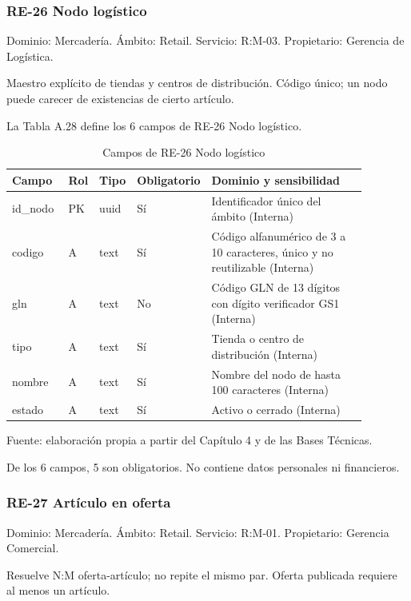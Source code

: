 \documentclass[11pt]{article}
\begin{document}
\subsubsection{RE-26 Nodo logístico}

Dominio: Mercadería. Ámbito: Retail. Servicio: R:M-03. Propietario: Gerencia de Logística.

Maestro explícito de tiendas y centros de distribución. Código único; un nodo puede carecer de existencias de cierto artículo.

La Tabla A.28 define los 6 campos de RE-26 Nodo logístico.

\begin{table}[htbp]
\caption{Campos de RE-26 Nodo logístico}\label{tab:d_re26}
\centering
\begin{tabular}{@{}p{0.167\linewidth}p{0.070\linewidth}p{0.079\linewidth}p{0.097\linewidth}p{0.465\linewidth}@{}}
\toprule Campo & Rol & Tipo & Obligatorio & Dominio y sensibilidad \\
\midrule
id\_nodo & PK & uuid & Sí & Identificador único del ámbito (Interna) \\
codigo & A & text & Sí & Código alfanumérico de 3 a 10 caracteres, único y no reutilizable (Interna) \\
gln & A & text & No & Código GLN de 13 dígitos con dígito verificador GS1 (Interna) \\
tipo & A & text & Sí & Tienda o centro de distribución (Interna) \\
nombre & A & text & Sí & Nombre del nodo de hasta 100 caracteres (Interna) \\
estado & A & text & Sí & Activo o cerrado (Interna) \\
\bottomrule
\end{tabular}
\par\smallskip
{\raggedright Fuente: elaboración propia a partir del Capítulo 4 y de las Bases Técnicas.\par}
\end{table}


De los 6 campos, 5 son obligatorios. No contiene datos personales ni financieros.

\subsubsection{RE-27 Artículo en oferta}

Dominio: Mercadería. Ámbito: Retail. Servicio: R:M-01. Propietario: Gerencia Comercial.

Resuelve N:M oferta-artículo; no repite el mismo par. Oferta publicada requiere al menos un artículo.
\end{document}
